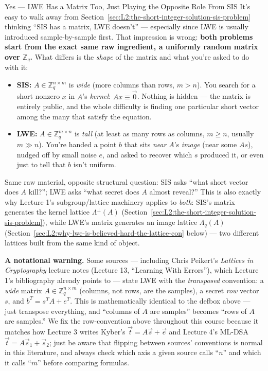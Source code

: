 \begin{rmkbox}{Yes --- LWE Has a Matrix Too, Just Playing the Opposite Role From SIS}
It's easy to walk away from Section~\ref{sec:L2:the-short-integer-solution-sis-problem} thinking ``SIS has a matrix, LWE doesn't'' --- especially since LWE is usually introduced sample-by-sample first. That impression is wrong: \textbf{both problems start from the exact same raw ingredient, a uniformly random matrix over $\mathbb{Z}_q$.} What differs is the \emph{shape} of the matrix and what you're asked to do with it:
\begin{itemize}[leftmargin=*]
  \item \textbf{SIS:} $A \in \mathbb{Z}_q^{n\times m}$ is \emph{wide} (more columns than rows, $m>n$). You search for a short nonzero $x$ in $A$'s \emph{kernel}: $Ax \equiv \vec 0$. Nothing is hidden --- the matrix is entirely public, and the whole difficulty is finding one particular short vector among the many that satisfy the equation.
  \item \textbf{LWE:} $A \in \mathbb{Z}_q^{m\times n}$ is \emph{tall} (at least as many rows as columns, $m\ge n$, usually $m\gg n$). You're handed a point $b$ that sits \emph{near} $A$'s \emph{image} (near some $As$), nudged off by small noise $e$, and asked to recover which $s$ produced it, or even just to tell that $b$ isn't uniform.
\end{itemize}
Same raw material, opposite structural question: SIS asks ``what short vector does $A$ kill?''; LWE asks ``what secret does $A$ almost reveal?'' This is also exactly why Lecture 1's subgroup/lattice machinery applies to \emph{both}: SIS's matrix generates the kernel lattice $\Lambda^\perp(A)$ (Section~\ref{sec:L2:the-short-integer-solution-sis-problem}), while LWE's matrix generates an image lattice $\Lambda_q(A)$ (Section~\ref{sec:L2:why-lwe-is-believed-hard-the-lattice-con} below) --- two different lattices built from the same kind of object.

\textbf{A notational warning.} Some sources --- including Chris Peikert's \emph{Lattices in Cryptography} lecture notes (Lecture 13, ``Learning With Errors''), which Lecture 1's bibliography already points to --- state LWE with the \emph{transposed} convention: a \emph{wide} matrix $A \in \mathbb{Z}_q^{n\times m}$ (columns, not rows, are the samples), a secret \emph{row} vector $s$, and $b^T = s^T A + e^T$. This is mathematically identical to the defbox above --- just transpose everything, and ``columns of $A$ are samples'' becomes ``rows of $A$ are samples.'' We fix the row-convention above throughout this course because it matches how Lecture 3 writes Kyber's $\vec t = A\vec s+\vec e$ and Lecture 4's ML-DSA $\vec t = A\vec s_1+\vec s_2$; just be aware that flipping between sources' conventions is normal in this literature, and always check which axis a given source calls ``$n$'' and which it calls ``$m$'' before comparing formulas.
\end{rmkbox}

